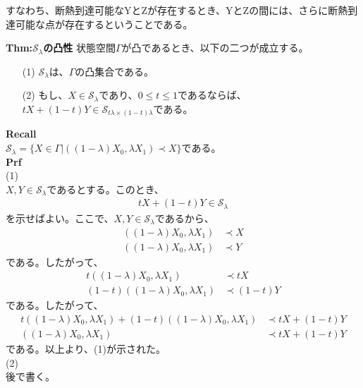 \documentclass[a4paper,11pt]{jsarticle}
\numberwithin{equation}{section}
\begin{document}
すなわち、断熱到達可能なYとZが存在するとき、YとZの間には、さらに断熱到達可能な点が存在するということである。\\

\begin{itembox}[l]{\textbf{Thm:$\mathcal{S}_{\lambda}$の凸性}}
    状態空間$\Gamma$が凸であるとき、以下の二つが成立する。
    \begin{itemize}
        \item[(1)] $\mathcal{S}_{\lambda}$は、$\Gamma$の凸集合である。
        \item[(2)] もし、$X \in \mathcal{S}_{\lambda}$であり、$0 \leq t \leq 1$であるならば、$tX + (1-t)Y \in \mathcal{S}_{t\lambda \times (1-t)\lambda}$である。
    \end{itemize}
\end{itembox}
\textbf{Recall}\\
$\mathcal{S}_{\lambda}= \{X \in \Gamma|((1-\lambda)X_0,\lambda X_1) \prec X\}$である。\\
\textbf{Prf}\\
(1)\\
$X,Y \in \mathcal{S}_{\lambda}$であるとする。このとき、
\begin{align}
    tX+(1-t)Y \in \mathcal{S}_{\lambda}
\end{align}
を示せばよい。ここで、$X,Y \in \mathcal{S}_{\lambda}$であるから、
\begin{align}
    ((1-\lambda)X_0,\lambda X_1) &\prec X\\
    ((1-\lambda)X_0,\lambda X_1) &\prec Y
\end{align}
である。したがって、
\begin{align}
    t((1-\lambda)X_0,\lambda X_1) &\prec tX\\
    (1-t)((1-\lambda)X_0,\lambda X_1) &\prec (1-t)Y
\end{align}
である。したがって、
\begin{align}
    t((1-\lambda)X_0,\lambda X_1)+(1-t)((1-\lambda)X_0,\lambda X_1) &\prec tX+(1-t)Y\\
    ((1-\lambda)X_0,\lambda X_1) &\prec tX+(1-t)Y
\end{align}
である。以上より、(1)が示された。\\
(2)\\
後で書く。\\
\end{document}
